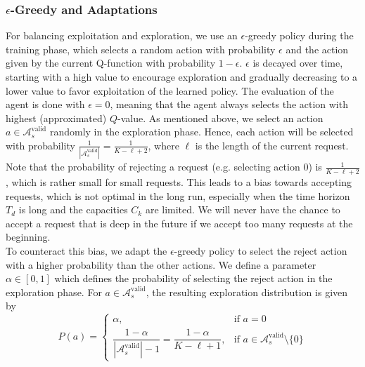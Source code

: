 \subsubsection{$\epsilon$-Greedy and Adaptations}
For balancing exploitation and exploration, we use an $\epsilon$-greedy policy during the training phase, which selects a random action with probability $\epsilon$ and the action given by the current Q-function with probability $1-\epsilon$.
$\epsilon$ is decayed over time, starting with a high value to encourage exploration and gradually decreasing to a lower value to favor exploitation of the learned policy.
The evaluation of the agent is done with $\epsilon=0$, meaning that the agent always selects the action with highest (approximated) $Q$-value.
As mentioned above, we select an action $a \in \mathcal{A}_s^{\text{valid}}$ randomly in the exploration phase. Hence, each action will be selected 
with probability $\frac{1}{|\mathcal{A}_s^{\text{valid}}|} = \frac{1}{K-\ell+2}$, where $\ell$ is the length of the current request.
Note that the probability of rejecting a request (e.g. selecting action $0$) is $\frac{1}{K-\ell+2}$, which is rather small for small requests. This leads to
a bias towards accepting requests, which is not optimal in the long run, especially when the time horizon $T_d$ is long and the capacities $C_k$ are limited. 
We will never have the chance to accept a request that is deep in the future if we accept too many requests at the beginning.\\
To counteract this bias, we adapt the $\epsilon$-greedy policy to select the reject action with a higher probability than the other actions.
We define a parameter $\alpha \in [0,1]$ which defines the probability of selecting the reject action in the exploration phase. For $a \in \mathcal{A}_s^{\text{valid}}$, the resulting exploration distribution is given by
\[
  P(a) = \begin{cases}
    \alpha, & \text{if } a = 0 \\[4pt]
    \dfrac{1-\alpha}{|\mathcal{A}_s^{\text{valid}}|-1} = \dfrac{1-\alpha}{K-\ell+1}, & \text{if } a \in \mathcal{A}_s^{\text{valid}} \setminus \{0\}
  \end{cases}
\]
